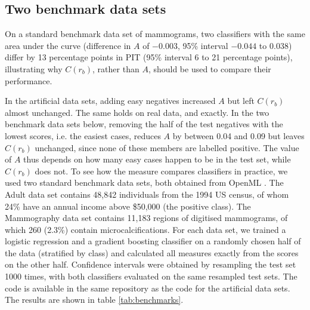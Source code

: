 \documentclass[preprint,12pt]{article}
\begin{document}
\subsection*{Two benchmark data sets}

\label{sec:benchmarks}

On a standard benchmark data set of mammograms, two classifiers with the same area under the curve (difference in $A$ of $-0.003$, 95\% interval $-0.044$ to $0.038$) differ by 13 percentage points in PIT (95\% interval 6 to 21 percentage points), illustrating why $C(r_b)$, rather than $A$, should be used to compare their performance.

In the artificial data sets, adding easy negatives increased $A$ but left $C(r_b)$ almost unchanged. The same holds on real data, and exactly. In the two benchmark data sets below, removing the half of the test negatives with the lowest scores, i.e. the easiest cases, reduces $A$ by between 0.04 and 0.09 but leaves $C(r_b)$ unchanged, since none of these members are labelled positive. The value of $A$ thus depends on how many easy cases happen to be in the test set, while $C(r_b)$ does not. To see how the measure compares classifiers in practice, we used two standard benchmark data sets, both obtained from OpenML \cite{vanschoren2013openml}. The Adult data set \cite{becker1996adult} contains 48,842 individuals from the 1994 US census, of whom 24\% have an annual income above \$50,000 (the positive class). The Mammography data set \cite{woods1993comparative} contains 11,183 regions of digitised mammograms, of which 260 (2.3\%) contain microcalcifications. For each data set, we trained a logistic regression and a gradient boosting classifier on a randomly chosen half of the data (stratified by class) and calculated all measures exactly from the scores on the other half. Confidence intervals were obtained by resampling the test set 1000 times, with both classifiers evaluated on the same resampled test sets. The code is available in the same repository as the code for the artificial data sets. The results are shown in table \ref{tab:benchmarks}.
\end{document}
